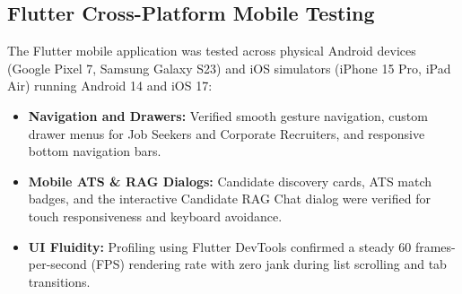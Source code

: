 \subsection{Flutter Cross-Platform Mobile Testing}
The Flutter mobile application was tested across physical Android devices (Google Pixel 7, Samsung Galaxy S23) and iOS simulators (iPhone 15 Pro, iPad Air) running Android 14 and iOS 17:
\begin{itemize}
    \item \textbf{Navigation and Drawers:} Verified smooth gesture navigation, custom drawer menus for Job Seekers and Corporate Recruiters, and responsive bottom navigation bars.
    \item \textbf{Mobile ATS & RAG Dialogs:} Candidate discovery cards, ATS match badges, and the interactive Candidate RAG Chat dialog were verified for touch responsiveness and keyboard avoidance.
    \item \textbf{UI Fluidity:} Profiling using Flutter DevTools confirmed a steady 60 frames-per-second (FPS) rendering rate with zero jank during list scrolling and tab transitions.
\end{itemize}

